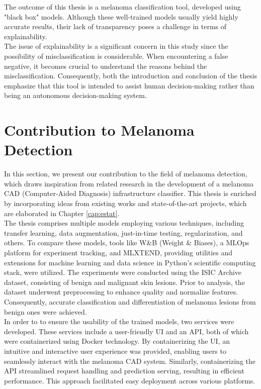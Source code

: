 The outcome of this thesis is a melanoma classification tool, developed using
"black box" models. Although these well-trained models usually yield highly
accurate results, their lack of transparency poses a challenge in terms of
explainability. \\

The issue of explainability is a significant concern in this study since the
possibility of misclassification is considerable. When encountering a false
negative, it becomes crucial to understand the reasons behind the
misclassification. Consequently, both the introduction and conclusion of the
thesis emphasize that this tool is intended to assist human decision-making
rather than being an autonomous decision-making system.

\section{Contribution to Melanoma Detection}

In this section, we present our contribution to the field of melanoma
detection, which draws inspiration from related research in the development of
a melanoma CAD (Computer-Aided Diagnosis) infrastructure classifier. This
thesis is enriched by incorporating ideas from existing works and
state-of-the-art projects, which are elaborated in Chapter \ref{cap:estat}. \\

The thesis comprises multiple models employing various techniques, including
transfer learning, data augmentation, just-in-time testing, regularization, and
others. To compare these models, tools like W\&B (Weight \& Biases), a MLOps
platform for experiment tracking, and MLXTEND, providing utilities and
extensions for machine learning and data science in Python's scientific
computing stack, were utilized. The experiments were conducted using the ISIC
Archive dataset, consisting of benign and malignant skin lesions. Prior to
analysis, the dataset underwent preprocessing to enhance quality and normalize
features. Consequently, accurate classification and differentiation of melanoma
lesions from benign ones were achieved. \\

In order to to ensure the usability of the trained models,
two services were developed. These services include a user-friendly UI and an
API, both of which were containerized using Docker technology. By
containerizing the UI, an intuitive and interactive user experience was
provided, enabling users to seamlessly interact with the melanoma CAD system.
Similarly, containerizing the API streamlined request handling and prediction
serving, resulting in efficient performance. This approach facilitated easy
deployment across various platforms.
